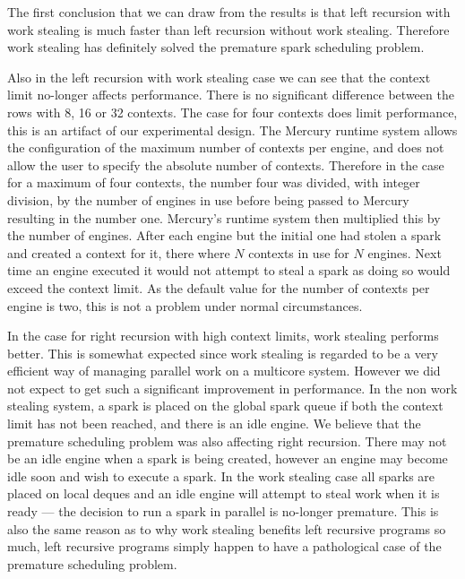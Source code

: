 The first conclusion that we can draw from the results is that
left recursion with work stealing is much faster than left recursion without
work stealing.
Therefore work stealing has definitely solved the premature spark scheduling
problem.

Also in the left recursion with work stealing case we can see that the
context limit no-longer affects performance.
There is no significant difference between the rows with 8, 16 or 32
contexts.
The case for four contexts does limit performance,
this is an artifact of our experimental design.
The Mercury runtime system allows the configuration of the maximum
number of contexts per engine, and does not allow the user to specify the
absolute number of contexts.
Therefore in the case for a maximum of four contexts, the number four was
divided,
with integer division,
by the number of engines in use before being passed to Mercury resulting in
the number one.
Mercury's runtime system then multiplied this by the number of engines.
After each engine but the initial one had stolen a spark and created a
context for it, there where $N$ contexts in use for $N$ engines.
Next time an engine executed \getglobalwork it would not attempt to steal a
spark as doing so would exceed the context limit.
As the default value for the number of contexts per engine is two,
this is not a problem under normal circumstances.

In the case for right recursion with high context limits, work stealing
performs better.
This is somewhat expected since work stealing is regarded to be a very
efficient way of managing parallel work on a multicore system.
However we did not expect to get such a significant improvement in
performance.
In the non work stealing system, a spark is placed on the global spark queue
if both the context limit has not been reached, and there is an idle engine.
We believe that the premature scheduling problem was also affecting right
recursion.
There may not be an idle engine when a spark is being created,
however an engine may become idle soon and wish to execute a spark.
In the work stealing case all sparks are placed on local deques and an idle
engine will attempt to steal work when it is ready ---
the decision to run a spark in parallel is no-longer premature.
This is also the same reason as to why work stealing benefits left
recursive programs so much,
left recursive programs simply happen to have a pathological case of
the premature scheduling problem.

